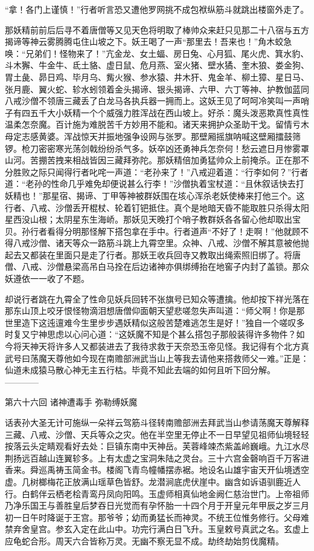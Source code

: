 \documentclass[12pt,UTF8]{ctexbook}
\begin{document}
“拿！各门上谨慎！”行者听言恐又遭他罗网挑不成包袱纵筋斗就跳出楼窗外走了。

那妖精前前后后寻不着唐僧等又见天色将明取了棒帅众来赶只见那二十八宿与五方揭谛等神云雾腾腾屯住山坡之下。妖王喝了一声“那里去！吾来也！”角木蛟急唤：“兄弟们！怪物来了！”亢金龙、女土蝠、房日兔、心月狐、尾火虎、箕水豹、斗木獬、牛金牛、氐土貉、虚日鼠、危月燕、室火猪、壁水獝、奎木狼、娄金狗、胃土彘、昴日鸡、毕月乌、觜火猴、参水猿、井木犴、鬼金羊、柳土獐、星日马、张月鹿、翼火蛇、轸水蚓领着金头揭谛、银头揭谛、六甲、六丁等神、护教伽蓝同八戒沙僧不领唐三藏丢了白龙马各执兵器一拥而上。这妖王见了呵呵冷笑叫一声哨子有四五千大小妖精一个个威强力胜浑战在西山坡上。好杀：魔头泼恶欺真性真性温柔怎奈魔。百计施为难脱苦千方妙用不能和。诸天来拥护众圣助干戈。留情亏木母定志感黄婆。浑战惊天并振地强争设网与张罗。那壁厢摇旗呐喊这壁厢擂鼓筛锣。枪刀密密寒光荡剑戟纷纷杀气多。妖卒凶还勇神兵怎奈何！愁云遮日月惨雾罩山河。苦掤苦拽来相战皆因三藏拜弥陀。那妖精倍加勇猛帅众上前掩杀。正在那不分胜败之际只闻得行者叱咤一声道：“老孙来了！”八戒迎着道：“行李如何？”行者道：“老孙的性命几乎难免却便说甚么行李！”沙僧执着宝杖道：“且休叙话快去打妖精也！”那星宿、揭谛、丁甲等神被群妖围在垓心浑杀老妖使棒来打他三个。这行者、八戒、沙僧丢开棍杖、轮着钉钯抵住。真个是地暗天昏不能取胜只杀得太阳星西没山根；太阴星东生海峤。那妖见天晚打个哨子教群妖各各留心他却取出宝贝。孙行者看得分明那怪解下搭包拿在手中。行者道声“不好了！走啊！”他就顾不得八戒沙僧、诸天等众一路筋斗跳上九霄空里。众神、八戒、沙僧不解其意被他抛起去又都装在里面只是走了行者。那妖王收兵回寺又教取出绳索照旧绑了。将唐僧、八戒、沙僧悬梁高吊白马拴在后边诸神亦俱绑缚抬在地窖子内封了盖锁。那众妖遵依一一收了不题。

却说行者跳在九霄全了性命见妖兵回转不张旗号已知众等遭擒。他却按下祥光落在那东山顶上咬牙恨怪物滴泪想唐僧仰面朝天望悲嗟忽失声叫道：“师父啊！你是那世里造下这迍邅难今生里步步遇妖精似这般苦楚难逃怎生是好！”独自一个嗟叹多时复又宁神思虑以心问心道：“这妖魔不知是个甚么搭包子那般装得许多物件？如今将天神天将许多人又都装进去了我待求救于天奈恐玉帝见怪。我记得有个北方真武号曰荡魔天尊他如今现在南赡部洲武当山上等我去请他来搭救师父一难。”正是：仙道未成猿马散心神无主五行枯。毕竟不知此去端的如何且听下回分解。
------------

第六十六回 诸神遭毒手 弥勒缚妖魔

话表孙大圣无计可施纵一朵祥云驾筋斗径转南赡部洲去拜武当山参请荡魔天尊解释三藏、八戒、沙僧、天兵等众之灾。他在半空里无停止不一日早望见祖师仙境轻轻按落云头定睛观看好去处：巨镇东南中天神岳。芙蓉峰竦杰紫盖岭巍峨。九江水尽荆扬远百越山连翼轸多。上有太虚之宝洞朱陆之灵台。三十六宫金磬响百千万客进香来。舜巡禹祷玉简金书。楼阁飞青鸟幢幡摆赤裾。地设名山雄宇宙天开仙境透空虚。几树榔梅花正放满山瑶草色皆舒。龙潜涧底虎伏崖中。幽含如诉语驯鹿近人行。白鹤伴云栖老桧青鸾丹凤向阳鸣。玉虚师相真仙地金阙仁慈治世门。上帝祖师乃净乐国王与善胜皇后梦吞日光觉而有孕怀胎一十四个月于开皇元年甲辰之岁三月初一日午时降诞于王宫。那爷爷；幼而勇猛长而神灵。不统王位惟务修行。父母难禁弃舍皇宫。参玄入定在此山中。功完行满白日飞升。玉皇敕号真武之名。玄虚上应龟蛇合形。周天六合皆称万灵。无幽不察无显不成。劫终劫始剪伐魔精。
\end{document}
